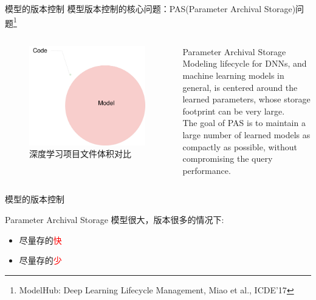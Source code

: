 \documentclass{beamer}
\begin{document}
\begin{frame}{模型的版本控制}
模型版本控制的核心问题：PAS(Parameter Archival Storage)问题\footnote{ModelHub: Deep Learning Lifecycle Management, Miao et al., ICDE'17}
\begin{columns}

\begin{figure}
    \centering
    \includegraphics[width=\textwidth]{contrast.pdf}
    \caption{深度学习项目文件体积对比}
    \label{fig:contrast}
\end{figure}

\begin{block}{Parameter Archival Storage}
Modeling lifecycle for DNNs, and machine learning models in general, is centered around the learned parameters, whose storage footprint can be very large.\\The goal of PAS is to maintain a large number of learned models as compactly as possible, without compromising the query performance.
\end{block}

\end{columns}
\end{frame}

\begin{frame}{模型的版本控制}
\begin{block}{Parameter Archival Storage}
模型很大，版本很多的情况下:\\
\begin{itemize}
    \item 尽量存的\textcolor{red}{快}
    \item 尽量存的\textcolor{red}{少}
\end{itemize}
\end{block}
\end{frame}
\end{document}
